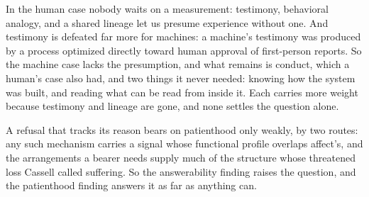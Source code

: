 In the human case nobody waits on a measurement: testimony, behavioral analogy, and a shared lineage let us presume experience without one.
And testimony is defeated far more for machines: a machine's testimony was produced by a process optimized directly toward human approval of first-person reports.
So the machine case lacks the presumption, and what remains is conduct, which a human's case also had, and two things it never needed: knowing how the system was built, and reading what can be read from inside it. Each carries more weight because testimony and lineage are gone, and none settles the question alone.

A refusal that tracks its reason bears on patienthood only weakly, by two routes: any such mechanism carries a signal whose functional profile overlaps affect's, and the arrangements a bearer needs supply much of the structure whose threatened loss Cassell called suffering. So the answerability finding raises the question, and the patienthood finding answers it as far as anything can.

